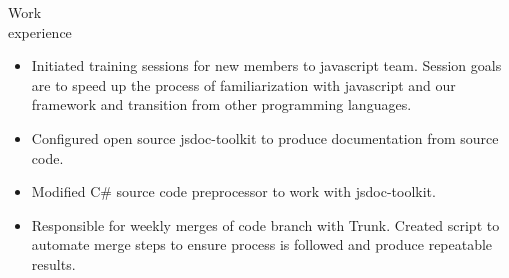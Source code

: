 \begin{category}{Work \\experience}
\begin{itemize}
\item Initiated training sessions for new members to javascript team. Session goals are to speed up the process of familiarization with javascript and our framework and transition from other programming languages. %
\item Configured open source jsdoc-toolkit to produce documentation from source code.
\item Modified C\# source code preprocessor to work with jsdoc-toolkit. %
\item Responsible for weekly merges of code branch with Trunk. Created script to automate merge steps to ensure process is followed and produce repeatable results. %




\end{itemize}
\end{category}
